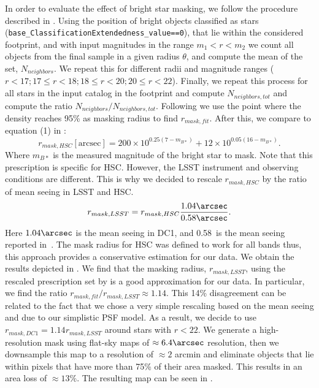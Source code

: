 \documentclass[\docopts]{\docclass}
\begin{document}
In order to evaluate the effect of bright star masking, we follow the procedure described in \citet{2018PASJ...70S...7C}. Using the position of bright objects classified as stars (\texttt{base\_ClassificationExtendedness\_value==0}), that lie within the considered footprint, and with input magnitudes in the range $m_{1} < r < m_{2}$ we count all objects from the final sample in a given radius $\theta$, and compute the mean of the set, $N_{neighbors}$. We repeat this for different radii and magnitude ranges ($ r < 17; 17 \leq r < 18; 18 \leq r < 20; 20 \leq r < 22$). Finally, we repeat this process for all stars in the input catalog in the footprint and compute $N_{neighbors, tot}$ and compute the ratio $N_{neighbors}/N_{neighbors, tot}$. Following \citet{2018PASJ...70S...7C} we use the point where the density reaches 95\% as masking radius to find $r_{mask,fit}$. After this, we compare to equation (1) in \citet{2018PASJ...70S..25M}:
\begin{equation}
r_{mask,HSC} [\mathrm{arcsec}]= 200\times 10^{0.25(7-m_{B*})} + 12 \times 10^{0.05(16-m_{B*})}.
\end{equation}
Where $m_{B*}$ is the measured magnitude of the bright star to mask. Note that this prescription is specific for HSC. However, the LSST instrument and observing conditions are different. This is why we decided to rescale $r_{mask,HSC}$ by the ratio of mean seeing in LSST and HSC.
\begin{equation}
r_{mask,LSST} = r_{mask,HSC} \frac{1.04\arcsec}{0.58\arcsec}.
\end{equation}
Here $1.04\arcsec$ is the mean seeing in DC1, and 0.58\arcsec~is the mean seeing reported in~\citet{2018PASJ...70S..25M}. The mask radius for HSC was defined to work for all bands thus, this approach provides a conservative estimation for our data. We obtain the results depicted in . We find that the masking radius, $r_{mask,LSST}$, using the rescaled prescription set by \citet{2018PASJ...70S..25M} is a good approximation for our data. In particular, we find the ratio $r_{mask,fit}/r_{mask,LSST} \approx 1.14$. This 14\% disagreement can be related to the fact that we chose a very simple rescaling based on the mean seeing and due to our simplistic PSF model. As a result, we decide to use $r_{mask, DC1} = 1.14 r_{mask, LSST}$ around stars with $r < 22$. We generate a high-resolution mask using flat-sky maps of $\approx 6.4 \arcsec$ resolution, then we downsample this map to a resolution of $\approx 2$ arcmin and eliminate objects that lie within pixels that have more than 75\% of their area masked. This results in an area loss of $\approx 13\%$. The resulting map can be seen in . 
\end{document}
